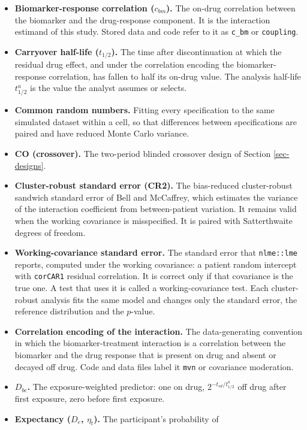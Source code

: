 \documentclass[
  11pt,
]{article}
\begin{document}
\begin{itemize}
\item
  \textbf{Biomarker-response correlation (\(c_{bm}\)).} The on-drug
  correlation between the biomarker and the drug-response component.
  It is the interaction estimand of this study. Stored data and code
  refer to it as \texttt{c\_bm} or \texttt{coupling}.
\item
  \textbf{Carryover half-life (\(t_{1/2}\)).} The time after
  discontinuation at which the residual drug effect, and under the
  correlation encoding the biomarker-response correlation, has
  fallen to half its on-drug value. The analysis half-life
  \(t^{a}_{1/2}\) is the value the analyst assumes or selects.
\item
  \textbf{Common random numbers.} Fitting every specification to the same
  simulated dataset within a cell, so that differences between
  specifications are paired and have reduced Monte Carlo variance.
\item
  \textbf{CO (crossover).} The two-period blinded crossover design of
  Section \ref{sec-designs}.
\item
  \textbf{Cluster-robust standard error (CR2).} The bias-reduced
  cluster-robust sandwich standard error of Bell and McCaffrey, which
  estimates the variance of the interaction coefficient from
  between-patient variation. It remains valid when the working
  covariance is misspecified. It is paired with Satterthwaite degrees
  of freedom.
\item
  \textbf{Working-covariance standard error.} The standard error that
  \texttt{nlme::lme} reports, computed under the working covariance: a
  patient random intercept with \texttt{corCAR1} residual correlation. It is
  correct only if that covariance is the true one. A test that uses
  it is called a working-covariance test. Each cluster-robust analysis
  fits the same model and changes only the standard error, the
  reference distribution and the \(p\)-value.
\item
  \textbf{Correlation encoding of the interaction.} The data-generating
  convention in which the biomarker-treatment interaction is a
  correlation between the biomarker and the drug response that is
  present on drug and absent or decayed off drug. Code and data
  files label it \texttt{mvn} or covariance moderation.
\item
  \textbf{\(D_{bc}\).} The exposure-weighted predictor: one on drug,
  \(2^{-t_{sd}/t^{a}_{1/2}}\) off drug after first exposure, zero
  before first exposure.
\item
  \textbf{Expectancy (\(D_e\), \(\eta_t\)).} The participant's probability of

\end{itemize}
\end{document}
